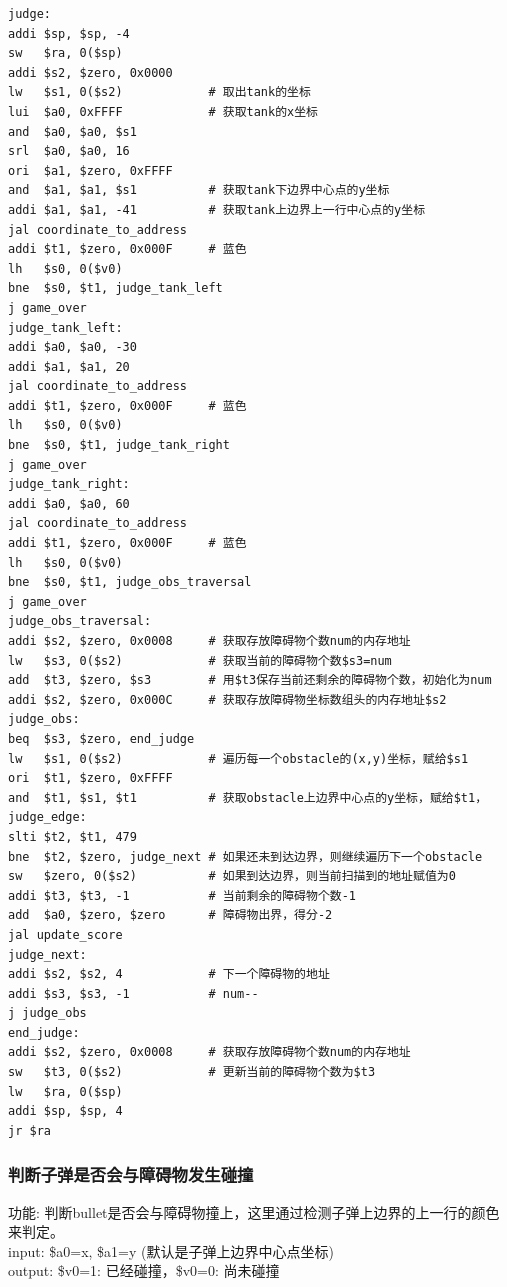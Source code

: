 \begin{lstlisting}[frame=shadowbox]
judge:
addi $sp, $sp, -4
sw   $ra, 0($sp)
addi $s2, $zero, 0x0000
lw   $s1, 0($s2)            # 取出tank的坐标
lui  $a0, 0xFFFF            # 获取tank的x坐标
and  $a0, $a0, $s1
srl  $a0, $a0, 16 
ori  $a1, $zero, 0xFFFF
and  $a1, $a1, $s1          # 获取tank下边界中心点的y坐标
addi $a1, $a1, -41          # 获取tank上边界上一行中心点的y坐标
jal coordinate_to_address
addi $t1, $zero, 0x000F     # 蓝色
lh   $s0, 0($v0)            
bne  $s0, $t1, judge_tank_left 
j game_over
judge_tank_left:
addi $a0, $a0, -30
addi $a1, $a1, 20
jal coordinate_to_address
addi $t1, $zero, 0x000F     # 蓝色
lh   $s0, 0($v0)            
bne  $s0, $t1, judge_tank_right 
j game_over
judge_tank_right:
addi $a0, $a0, 60
jal coordinate_to_address
addi $t1, $zero, 0x000F     # 蓝色
lh   $s0, 0($v0)            
bne  $s0, $t1, judge_obs_traversal 
j game_over
judge_obs_traversal:
addi $s2, $zero, 0x0008     # 获取存放障碍物个数num的内存地址
lw   $s3, 0($s2)            # 获取当前的障碍物个数$s3=num
add  $t3, $zero, $s3        # 用$t3保存当前还剩余的障碍物个数，初始化为num
addi $s2, $zero, 0x000C     # 获取存放障碍物坐标数组头的内存地址$s2
judge_obs:
beq  $s3, $zero, end_judge
lw   $s1, 0($s2)            # 遍历每一个obstacle的(x,y)坐标，赋给$s1
ori  $t1, $zero, 0xFFFF
and  $t1, $s1, $t1          # 获取obstacle上边界中心点的y坐标，赋给$t1，
judge_edge:
slti $t2, $t1, 479
bne  $t2, $zero, judge_next # 如果还未到达边界，则继续遍历下一个obstacle
sw   $zero, 0($s2)          # 如果到达边界，则当前扫描到的地址赋值为0
addi $t3, $t3, -1           # 当前剩余的障碍物个数-1 
add  $a0, $zero, $zero      # 障碍物出界，得分-2
jal update_score
judge_next:
addi $s2, $s2, 4            # 下一个障碍物的地址
addi $s3, $s3, -1           # num--
j judge_obs
end_judge:
addi $s2, $zero, 0x0008     # 获取存放障碍物个数num的内存地址
sw   $t3, 0($s2)            # 更新当前的障碍物个数为$t3
lw   $ra, 0($sp)
addi $sp, $sp, 4
jr $ra
\end{lstlisting}

\subsubsection{判断子弹是否会与障碍物发生碰撞}
功能: 判断bullet是否会与障碍物撞上，这里通过检测子弹上边界的上一行的颜色来判定。\\
input: \$a0=x, \$a1=y (默认是子弹上边界中心点坐标)\\
output: \$v0=1: 已经碰撞，\$v0=0: 尚未碰撞\\

